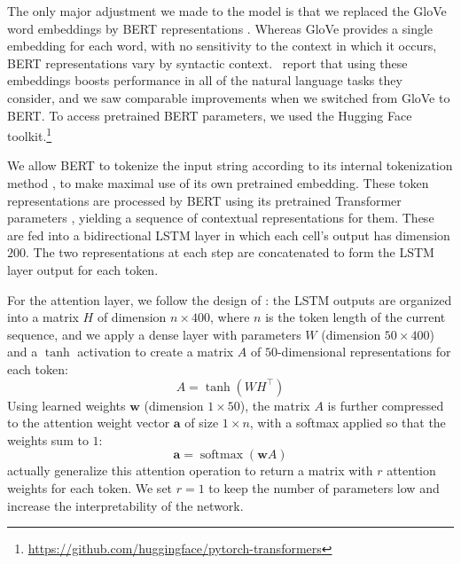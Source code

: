 \documentclass[11pt,a4paper]{article}
\DeclareMathOperator{\softmax}{softmax}
\begin{document}


The only major adjustment we made to the model is that we replaced the GloVe word embeddings \citep{Pennington:2014} by BERT representations \citep{Devlin:2018}. Whereas GloVe provides a single embedding for each word, with no sensitivity to the context in which it occurs, BERT representations vary by syntactic context. \citeauthor{Devlin:2018}\ report that using these embeddings boosts performance in all of the natural language tasks they consider, and we saw comparable improvements when we switched from GloVe to BERT. To access pretrained BERT parameters, we used the Hugging Face toolkit.\footnote{\url{https://github.com/huggingface/pytorch-transformers}}

We allow BERT to tokenize the input string according to its internal tokenization method \citep{wu2016google}, to make maximal use of its own pretrained embedding. These token representations are processed by BERT using its pretrained Transformer parameters \citep{Vaswani:2017}, yielding a sequence of contextual representations for them. These are fed into a bidirectional LSTM layer in which each cell's output has dimension $200$. The two representations at each step are concatenated to form the LSTM layer output for each token.

For the attention layer, we follow the design of \citeauthor{Lin:2017}: the LSTM outputs are organized into a matrix $H$ of dimension $n \times 400$, where $n$ is the token length of the current sequence, and we apply a dense layer with parameters $W$ (dimension $50 \times 400$) and a $\tanh$ activation to create a matrix $A$ of $50$-dimensional representations for each token:
%
\begin{equation}
  A = \tanh(WH^{\top}) \label{eq:A}
\end{equation}
%
Using learned weights $\mathbf{w}$ (dimension $1 \times 50$), the matrix $A$ is further compressed to the attention weight vector $\mathbf{a}$ of size $1 \times n$, with a softmax applied so that the weights sum to $1$:
%
\begin{equation}
  \mathbf{a} = \softmax(\mathbf{w} A) \label{eq:attn}
\end{equation}
%
\citeauthor{Lin:2017} actually generalize this attention operation to return a matrix with $r$ attention weights for each token. We set $r=1$ to keep the number of parameters low and increase the interpretability of the network.
\end{document}
